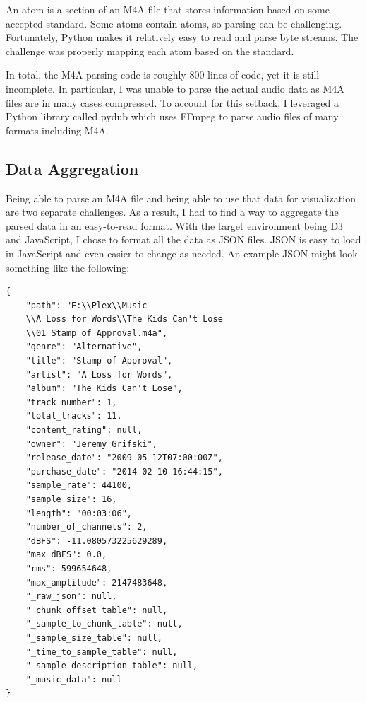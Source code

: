 \documentclass[journal]{vgtc}                %
\begin{document}
An atom is a section of an M4A file that stores information based on some accepted
standard. Some atoms contain atoms, so parsing can be challenging. Fortunately,
Python makes it relatively easy to read and parse byte streams. The challenge
was properly mapping each atom based on the standard.

In total, the M4A parsing code is roughly 800 lines of code, yet it is still
incomplete. In particular, I was unable to parse the actual audio data as
M4A files are in many cases compressed. To account for this setback, I leveraged
a Python library called pydub which uses FFmpeg to parse audio files of many
formats including M4A.

\subsection{Data Aggregation}

Being able to parse an M4A file and being able to use that data for visualization
are two separate challenges. As a result, I had to find a way to aggregate the
parsed data in an easy-to-read format. With the target environment being D3
and JavaScript, I chose to format all the data as JSON files. JSON is easy
to load in JavaScript and even easier to change as needed. An example JSON
might look something like the following:

\begin{verbatim}
{
    "path": "E:\\Plex\\Music
    \\A Loss for Words\\The Kids Can't Lose
    \\01 Stamp of Approval.m4a",
    "genre": "Alternative",
    "title": "Stamp of Approval",
    "artist": "A Loss for Words",
    "album": "The Kids Can't Lose",
    "track_number": 1,
    "total_tracks": 11,
    "content_rating": null,
    "owner": "Jeremy Grifski",
    "release_date": "2009-05-12T07:00:00Z",
    "purchase_date": "2014-02-10 16:44:15",
    "sample_rate": 44100,
    "sample_size": 16,
    "length": "00:03:06",
    "number_of_channels": 2,
    "dBFS": -11.080573225629289,
    "max_dBFS": 0.0,
    "rms": 599654648,
    "max_amplitude": 2147483648,
    "_raw_json": null,
    "_chunk_offset_table": null,
    "_sample_to_chunk_table": null,
    "_sample_size_table": null,
    "_time_to_sample_table": null,
    "_sample_description_table": null,
    "_music_data": null
}
\end{verbatim}
\end{document}
